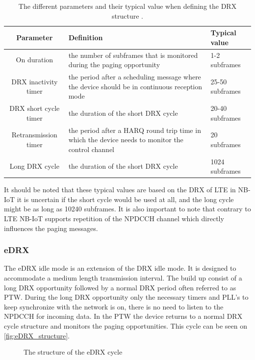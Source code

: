 \begin{table}[H]
\centering
\begin{tabular}{|c|p{6cm}|p{4cm}|} \hline
\textbf{Parameter} & \textbf{Definition} & \textbf{Typical value} \\ \hline 
On duration &  the number of subframes that is monitored during the paging opportunity & 1-2 subframes\\ \hline
DRX inactivity timer & the period after a scheduling message where the device should be in continuous reception mode & 25-50 subframes \\ \hline
DRX short cycle timer & the duration of the short DRX cycle & 20-40 subframes \\ \hline
Retransmission timer & the period after a \gls{HARQ} round trip time in which the device needs to monitor the control channel & 20  subframes \\ \hline
Long DRX cycle & the duration of the short DRX cycle & 1024 subframes \\ \hline
\end{tabular}
\caption{The different parameters and their typical value when defining the DRX structure \citep{book_LTE_for_UMTS}.}
\label{tab:DRX_parameters}
\end{table}

It should be noted that these typical values are based on the DRX of LTE in NB-IoT it is uncertain if the short cycle would be used at all, and the long cycle might be as long as 10240 subframes. It is also important to note that contrary to LTE NB-IoT supports repetition of the NPDCCH channel which directly influences the paging messages. \citep{NB-IoT_Book}


\subsubsection{eDRX}
The eDRX idle mode is an extension of the DRX idle mode. It is designed to accommodate a medium length transmission interval. The build up consist of a long DRX opportunity followed by a normal DRX period often referred to as \gls{PTW}. During the long DRX opportunity only the necessary timers and PLL's to keep synchronize with the network is on, there is no need to listen to the NPDCCH for incoming data. In the \gls{PTW} the device returns to a normal DRX cycle structure and monitors the paging opportunities. This cycle can be seen on \autoref{fig:eDRX_structure}.

\begin{figure}[H]
\centering
\resizebox{\textwidth}{!}{
}
\caption{The structure of the \gls{eDRX} cycle}
\label{fig:eDRX_structure}
\end{figure}

